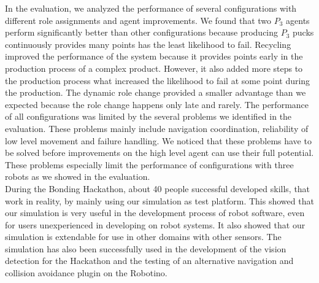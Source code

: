 In the evaluation, we analyzed the performance of several configurations with different role assignments and agent improvements. We found that two $P_3$ agents perform significantly better than other configurations because producing $P_3$ pucks continuously provides many points has the least likelihood to fail. Recycling improved the performance of the system because it provides points early in the production process of a complex product. However, it also added more steps to the production process what increased the likelihood to fail at some point during the production. The dynamic role change provided a smaller advantage than we expected because the role change happens only late and rarely. The performance of all configurations was limited by the several problems we identified in the evaluation. These problems mainly include navigation coordination, reliability of low level movement and failure handling. We noticed that these problems have to be solved before improvements on the high level agent can use their full potential. These problems especially limit the performance of configurations with three robots as we showed in the evaluation.\\
During the Bonding Hackathon, about 40 people successful developed skills, that work in reality, by mainly using our simulation as test platform. This showed that our simulation is very useful in the development process of robot software, even for users unexperienced in developing on robot systems. It also showed that our simulation is extendable for use in other domains with other sensors. The simulation has also been successfully used in the development of the vision detection for the Hackathon and the testing of an alternative navigation and collision avoidance plugin on the Robotino.

